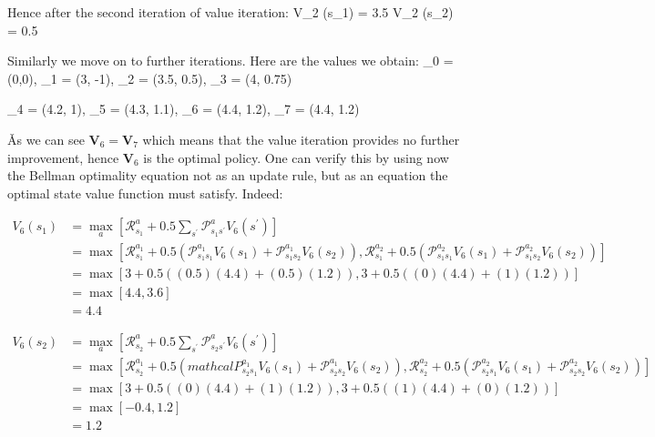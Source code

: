 \vspace{-10pt}

Hence after the second iteration of value iteration:
\bse
V_2 (s_1) = 3.5 \qquad V_2 (s_2) = 0.5
\ese

Similarly we move on to further iterations. Here are the values we obtain:
\bse
{}_0 = (0,0), \qquad {}_1 = (3, -1), \qquad {}_2 = (3.5, 0.5), \qquad
{}_3 = (4, 0.75)
\ese

\bse
{}_4 = (4.2, 1), \qquad {}_5 = (4.3, 1.1), \qquad {}_6 = (4.4, 1.2), \qquad
{}_7 = (4.4, 1.2)
\ese

\v

As we can see $\boldsymbol{V}_6 = \boldsymbol{V}_7$ which means that the value iteration provides no further
improvement, hence $\boldsymbol{V}_6$ is the optimal policy. One can verify this by using now the Bellman optimality
equation not as an update rule, but as an equation the optimal state value function must satisfy. Indeed:

{\setlength{\jot}{10pt}
\begin{align*}
V_6 (s_1) & = \max_{a} \left[ \mathcal{R}_{s_1}^{a} +
0.5 \sum_{s^{\prime}} \mathcal{P}_{s_1 s^\prime}^{a} V_6 (s^\prime) \right] \\
& = \max \left[ \mathcal{R}_{s_1}^{a_1} + 0.5 \left( \mathcal{P}_{s_1 s_1}^{a_1} V_6 (s_1) +
\mathcal{P}_{s_1 s_2}^{a_1} V_6 (s_2) \right), \mathcal{R}_{s_1}^{a_2} +
0.5 \left(\mathcal{P}_{s_1 s_1}^{a_2} V_6 (s_1) + \mathcal{P}_{s_1 s_2}^{a_2} V_6 (s_2) \right) \right] \\
& = \max \left[ 3 + 0.5 \left( (0.5) (4.4) + (0.5) (1.2) \right), 3 + 0.5 \left( (0) (4.4) + (1) (1.2) \right) \right] \\
& = \max \left[ 4.4, 3.6 \right] \\
& = 4.4
\end{align*}}

\vspace{-30pt}

{\setlength{\jot}{10pt}
\begin{align*}
V_6 (s_2) & = \max_{a} \left[ \mathcal{R}_{s_2}^{a} + 0.5 \sum_{s^{\prime}} \mathcal{P}_{s_2 s^\prime}^{a}
V_6 (s^\prime) \right] \\
& = \max \left[ \mathcal{R}_{s_2}^{a_1} +
0.5 \left(mathcal{P}_{s_2 s_1}^{a_1} V_6 (s_1) + \mathcal{P}_{s_2 s_2}^{a_1} V_6 (s_2) \right),
\mathcal{R}_{s_2}^{a_2} + 0.5 \left( \mathcal{P}_{s_2 s_1}^{a_2} V_6 (s_1) +
\mathcal{P}_{s_2 s_2}^{a_2} V_6 (s_2) \right) \right] \\
& = \max \left[ 3 + 0.5 \left( (0) (4.4) + (1) (1.2) \right), 3 + 0.5 \left( (1) (4.4) + (0) (1.2) \right) \right] \\
& = \max \left[ -0.4, 1.2 \right] \\
& = 1.2
\end{align*}}

